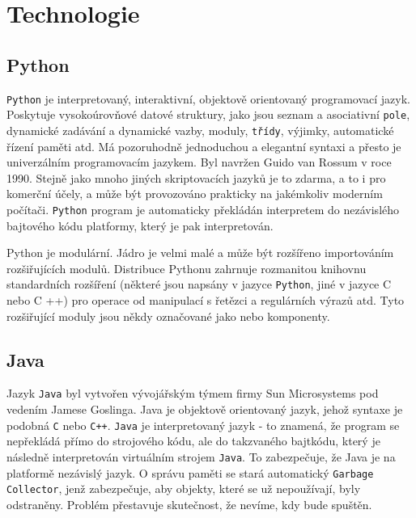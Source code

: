 \documentclass[czech,BP]{thesiskiv}
\begin{document}
	
	
	
	
\chapter{Technologie}
		\section{Python}
			\texttt{Python} je interpretovaný, interaktivní, objektově orientovaný programovací jazyk. Poskytuje vysokoúrovňové datové struktury, jako jsou seznam a asociativní \texttt{pole}, dynamické zadávání a dynamické vazby, moduly, \texttt{třídy}, výjimky, automatické řízení paměti atd. Má pozoruhodně jednoduchou a elegantní syntaxi a přesto je univerzálním programovacím jazykem. Byl navržen Guido van Rossum v roce 1990. Stejně jako mnoho jiných skriptovacích jazyků je to zdarma, a to i pro komerční účely, a může být provozováno prakticky na jakémkoliv moderním počítači. \texttt{Python} program je automaticky překládán interpretem do nezávislého bajtového kódu platformy, který je pak interpretován.\cite{sanner1999python}

Python je modulární. Jádro je velmi malé a může být rozšířeno importováním rozšiřujících modulů. Distribuce Pythonu zahrnuje rozmanitou knihovnu standardních rozšíření (některé jsou napsány v jazyce \texttt{Python}, jiné v jazyce C nebo C ++) pro operace od manipulací s řetězci a regulárních výrazů atd. Tyto rozšiřující moduly jsou někdy označované jako  nebo komponenty.\cite{sanner1999python}
			
		
		\section{Java}
		Jazyk \texttt{Java} byl vytvořen vývojářským týmem firmy Sun Microsystems pod vedením Jamese Goslinga. Java je objektově orientovaný jazyk, jehož syntaxe je podobná \texttt{C} nebo \texttt{C++}. \texttt{Java} je interpretovaný jazyk - to znamená, že program se nepřekládá přímo do strojového kódu, ale do takzvaného bajtkódu, který je následně interpretován virtuálním strojem \texttt{Java}. To zabezpečuje, že Java je na platformě nezávislý jazyk. O správu paměti se stará automatický \texttt{Garbage Collector}, jenž zabezpečuje, aby objekty, které se už nepoužívají, byly odstraněny. Problém přestavuje skutečnost, že nevíme, kdy bude spuštěn.\cite{lacko2017vyvoj}
	
\end{document}
